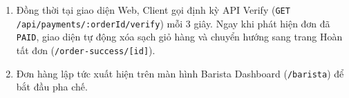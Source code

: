 \documentclass[11pt,a4paper]{article}
\begin{document}
\begin{enumerate}[leftmargin=*,resume]
    \begin{itemize}[leftmargin=*]
        \item Backend xác thực chữ ký số HMAC-SHA256 để chống giả mạo dữ liệu.
        \item Sử dụng truy vấn nguyên tử \texttt{updateMany} kiểm tra trạng thái: chỉ cập nhật đơn nếu trạng thái đang là \texttt{PENDING}.
        \item Cập nhật trạng thái đơn hàng sang \texttt{PAID}, thanh toán sang \texttt{SUCCESS}.
        \item Tự động tính toán và cộng điểm thưởng \texttt{loyaltyPoints} theo tỷ lệ 1 điểm / 10.000 VNĐ.
    \end{itemize}
    \item Đồng thời tại giao diện Web, Client gọi định kỳ API Verify (\texttt{GET /api/payments/:orderId/verify}) mỗi 3 giây. Ngay khi phát hiện đơn đã \texttt{PAID}, giao diện tự động xóa sạch giỏ hàng và chuyển hướng sang trang Hoàn tất đơn (\texttt{/order-success/[id]}).
    \item Đơn hàng lập tức xuất hiện trên màn hình Barista Dashboard (\texttt{/barista}) để bắt đầu pha chế.
\end{enumerate}
\end{document}

